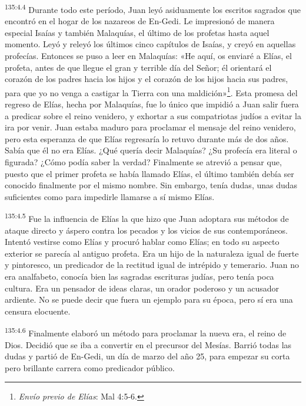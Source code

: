 \par 
\textsuperscript{135:4.4} Durante todo este período, Juan leyó asiduamente los escritos sagrados que encontró en el hogar de los nazareos de En-Gedi. Le impresionó de manera especial Isaías y también Malaquías, el último de los profetas hasta aquel momento. Leyó y releyó los últimos cinco capítulos de Isaías, y creyó en aquellas profecías. Entonces se puso a leer en Malaquías: «He aquí, os enviaré a Elías, el profeta, antes de que llegue el gran y terrible día del Señor; él orientará el corazón de los padres hacia los hijos y el corazón de los hijos hacia sus padres, para que yo no venga a castigar la Tierra con una maldición»\footnote{\textit{Envío previo de Elías}: Mal 4:5-6.}. Esta promesa del regreso de Elías, hecha por Malaquías, fue lo único que impidió a Juan salir fuera a predicar sobre el reino venidero, y exhortar a sus compatriotas judíos a evitar la ira por venir. Juan estaba maduro para proclamar el mensaje del reino venidero, pero esta esperanza de que Elías regresaría lo retuvo durante más de dos años. Sabía que él no era Elías. ¿Qué quería decir Malaquías? ¿Su profecía era literal o figurada? ¿Cómo podía saber la verdad? Finalmente se atrevió a pensar que, puesto que el primer profeta se había llamado Elías, el último también debía ser conocido finalmente por el mismo nombre. Sin embargo, tenía dudas, unas dudas suficientes como para impedirle llamarse a sí mismo Elías.

\par 
\textsuperscript{135:4.5} Fue la influencia de Elías la que hizo que Juan adoptara sus métodos de ataque directo y áspero contra los pecados y los vicios de sus contemporáneos. Intentó vestirse como Elías y procuró hablar como Elías; en todo su aspecto exterior se parecía al antiguo profeta. Era un hijo de la naturaleza igual de fuerte y pintoresco, un predicador de la rectitud igual de intrépido y temerario. Juan no era analfabeto, conocía bien las sagradas escrituras judías, pero tenía poca cultura. Era un pensador de ideas claras, un orador poderoso y un acusador ardiente. No se puede decir que fuera un ejemplo para su época, pero sí era una censura elocuente.

\par 
\textsuperscript{135:4.6} Finalmente elaboró un método para proclamar la nueva era, el reino de Dios. Decidió que se iba a convertir en el precursor del Mesías. Barrió todas las dudas y partió de En-Gedi, un día de marzo del año 25, para empezar su corta pero brillante carrera como predicador público.

